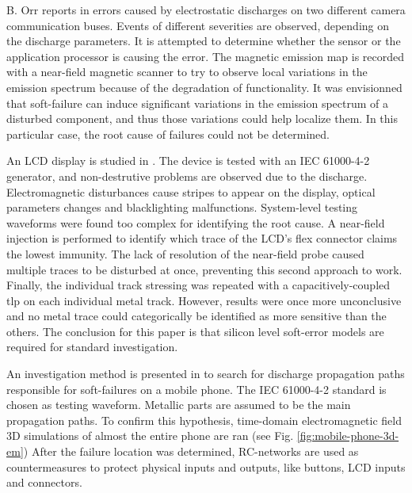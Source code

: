 B. Orr reports in \cite{softFailSubsystem} errors caused by electrostatic discharges on two different camera communication buses.
Events of different severities are observed, depending on the discharge parameters.
It is attempted to determine whether the sensor or the application processor is causing the error.
The magnetic emission map is recorded with a near-field magnetic scanner to try to observe local variations in the emission spectrum because of the degradation of functionality.
It was envisionned that soft-failure can induce significant variations in the emission spectrum of a disturbed component, and thus those variations could help localize them.
In this particular case, the root cause of failures could not be determined.

An LCD display is studied in \cite{softFailLCD}.
The device is tested with an IEC 61000-4-2 \cite{iec61000-4-2} generator, and non-destrutive problems are observed due to the discharge.
Electromagnetic disturbances cause stripes to appear on the display, optical parameters changes and blacklighting malfunctions.
System-level testing waveforms were found too complex for identifying the root cause.
A near-field injection is performed to identify which trace of the LCD's flex connector claims the lowest immunity.
The lack of resolution of the near-field probe caused multiple traces to be disturbed at once, preventing this second approach to work.
Finally, the individual track stressing was repeated with a capacitively-coupled \gls{tlp} on each individual metal track.
However, results were once more unconclusive and no metal trace could categorically be identified as more sensitive than the others.
The conclusion for this paper is that silicon level soft-error models are required for standard investigation.

An investigation method is presented in \cite{softFailMobile} to search for discharge propagation paths responsible for soft-failures on a mobile phone.
The IEC 61000-4-2 standard is chosen as testing waveform.
Metallic parts are assumed to be the main propagation paths.
To confirm this hypothesis, time-domain electromagnetic field 3D simulations of almost the entire phone are ran (see Fig. \ref{fig:mobile-phone-3d-em})
After the failure location was determined, RC-networks are used as countermeasures to protect physical inputs and outputs, like buttons, LCD inputs and connectors.

